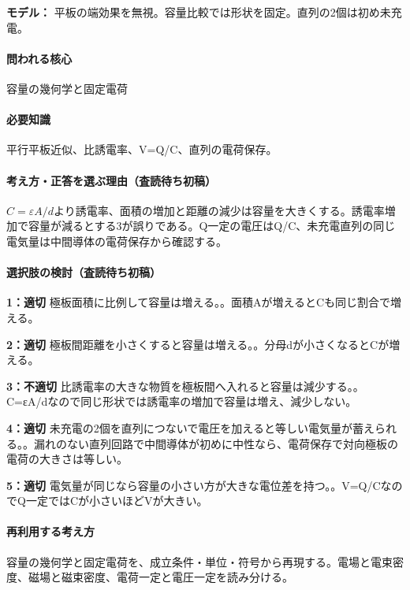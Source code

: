 \noindent\textbf{モデル：} 平板の端効果を無視。容量比較では形状を固定。直列の2個は初め未充電。\par

\paragraph{問われる核心} 容量の幾何学と固定電荷

\paragraph{必要知識} 平行平板近似、比誘電率、V=\allowbreak{}Q/C、直列の電荷保存。

\paragraph{考え方・正答を選ぶ理由（査読待ち初稿）} \(C=\varepsilon A/d\)より誘電率、面積の増加と距離の減少は容量を大きくする。誘電率増加で容量が減るとする3が誤りである。Q一定の電圧はQ/C、未充電直列の同じ電気量は中間導体の電荷保存から確認する。

\paragraph{選択肢の検討（査読待ち初稿）}\mbox{}\par

\noindent\textbf{1：適切} 極板面積に比例して容量は増える。。面積Aが増えるとCも同じ割合で増える。\par

\noindent\textbf{2：適切} 極板間距離を小さくすると容量は増える。。分母dが小さくなるとCが増える。\par

\noindent\textbf{3：不適切} 比誘電率の大きな物質を極板間へ入れると容量は減少する。。C=εA/dなので同じ形状では誘電率の増加で容量は増え、減少しない。\par

\noindent\textbf{4：適切} 未充電の2個を直列につないで電圧を加えると等しい電気量が蓄えられる。。漏れのない直列回路で中間導体が初めに中性なら、電荷保存で対向極板の電荷の大きさは等しい。\par

\noindent\textbf{5：適切} 電気量が同じなら容量の小さい方が大きな電位差を持つ。。V=\allowbreak{}Q/CなのでQ一定ではCが小さいほどVが大きい。\par

\paragraph{再利用する考え方} 容量の幾何学と固定電荷を、成立条件・単位・符号から再現する。電場と電束密度、磁場と磁束密度、電荷一定と電圧一定を読み分ける。

